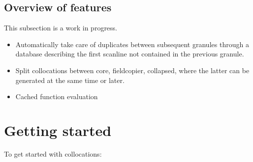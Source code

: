 \documentclass[a4paper,10pt]{article}
\begin{document}
\subsection{Overview of features}

This subsection is a work in progress.

\begin{itemize}
\item Automatically take care of duplicates between subsequent granules
through a database describing the first scanline not contained in the
previous granule.
\item Split collocations between core, fieldcopier, collapsed, where the
latter can be generated at the same time or later.
\item Cached function evaluation
\end{itemize}

\section{Getting started}

To get started with collocations:
\end{document}
